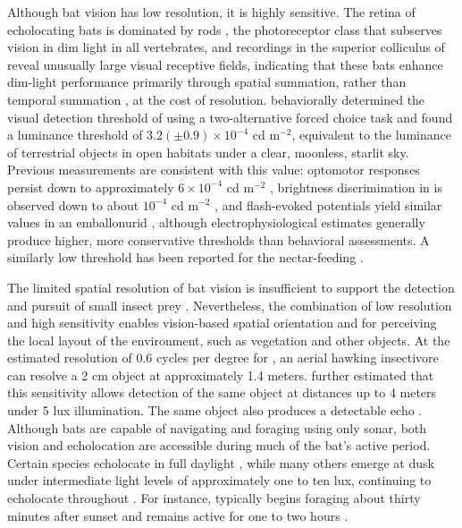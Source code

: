 \documentclass[11pt]{article}
\begin{document}
Although bat vision has low resolution, it is highly sensitive. The retina of echolocating bats is dominated by rods \citep{Suthers1970}, the photoreceptor class that subserves vision in dim light in all vertebrates, and recordings in the superior colliculus of  reveal unusually large visual receptive fields, indicating that these bats enhance dim-light performance primarily through spatial summation, rather than temporal summation \citep{Hoffmann2019}, at the cost of resolution. \citet{Cechetto2023} behaviorally determined the visual detection threshold of  using a two-alternative forced choice task and found a luminance threshold of $3.2(\pm0.9)\times10^{-4}$ cd m$^{-2}$, equivalent to the luminance of terrestrial objects in open habitats under a clear, moonless, starlit sky. Previous measurements are consistent with this value: optomotor responses persist down to approximately $6\times10^{-4}$ cd m$^{-2}$ \citep{Bell1986}, brightness discrimination in  is observed down to about $10^{-4}$ cd m$^{-2}$ \citep{Ellins1974}, and flash-evoked potentials yield similar values in an emballonurid \citep{Liu2015}, although electrophysiological estimates generally produce higher, more conservative thresholds than behavioral assessments. A similarly low threshold has been reported for the nectar-feeding  \citep{Winter2003}.

The limited spatial resolution of bat vision is insufficient to support the detection and pursuit of small insect prey \citep{Rydell2003}. Nevertheless, the combination of low resolution and high sensitivity enables vision-based spatial orientation \citep{Cechetto2023,Boonman2013} and for perceiving the local layout of the environment, such as vegetation and other objects. At the estimated resolution of 0.6 cycles per degree for  \citep{Cechetto2020}, an aerial hawking insectivore can resolve a 2 cm object at approximately 1.4 meters. \citet{Boonman2013} further estimated that this sensitivity allows detection of the same object at distances up to 4 meters under 5 lux illumination. The same object also produces a detectable echo \cite[e.g.,][]{Stilz2012}. Although bats are capable of navigating and foraging using only sonar, both vision and echolocation are accessible during much of the bat's active period. Certain species echolocate in full daylight \citep{Eitan2022}, while many others emerge at dusk under intermediate light levels of approximately one to ten lux, continuing to echolocate throughout \citep{Boonman2013,Holland2005}. For instance,  typically begins foraging about thirty minutes after sunset and remains active for one to two hours \citep{Rydell1996}.
\end{document}
